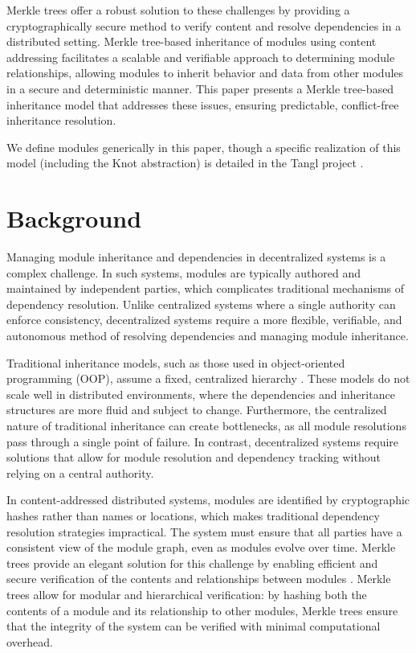 \documentclass[sigplan,screen]{acmart}
\begin{document}
Merkle trees offer a robust solution to these challenges by providing a cryptographically secure method to verify content and resolve dependencies in a distributed setting. Merkle tree-based inheritance of modules using content addressing facilitates a scalable and verifiable approach to determining module relationships, allowing modules to inherit behavior and data from other modules in a secure and deterministic manner. This paper presents a Merkle tree-based inheritance model that addresses these issues, ensuring predictable, conflict-free inheritance resolution.

We define modules generically in this paper, though a specific realization of this model (including the Knot abstraction) is detailed in the Tangl project \cite{tangl}.

\section{Background}
\label{sec:background}

Managing module inheritance and dependencies in decentralized systems is a complex challenge. In such systems, modules are typically authored and maintained by independent parties, which complicates traditional mechanisms of dependency resolution. Unlike centralized systems where a single authority can enforce consistency, decentralized systems require a more flexible, verifiable, and autonomous method of resolving dependencies and managing module inheritance.

Traditional inheritance models, such as those used in object-oriented programming (OOP), assume a fixed, centralized hierarchy \cite{hewitt1977}. These models do not scale well in distributed environments, where the dependencies and inheritance structures are more fluid and subject to change. Furthermore, the centralized nature of traditional inheritance can create bottlenecks, as all module resolutions pass through a single point of failure. In contrast, decentralized systems require solutions that allow for module resolution and dependency tracking without relying on a central authority.

In content-addressed distributed systems, modules are identified by cryptographic hashes rather than names or locations, which makes traditional dependency resolution strategies impractical. The system must ensure that all parties have a consistent view of the module graph, even as modules evolve over time. Merkle trees provide an elegant solution for this challenge by enabling efficient and secure verification of the contents and relationships between modules \cite{merkle1987}. Merkle trees allow for modular and hierarchical verification: by hashing both the contents of a module and its relationship to other modules, Merkle trees ensure that the integrity of the system can be verified with minimal computational overhead.
\end{document}
